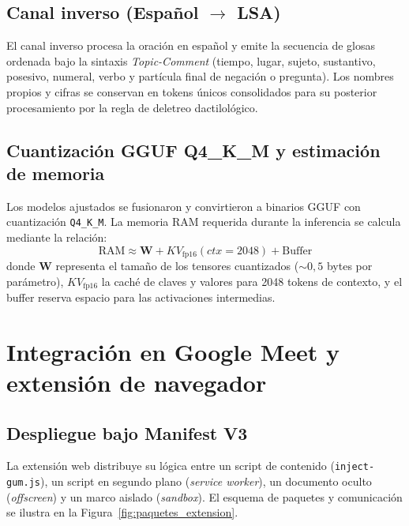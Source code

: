 \subsection{Canal inverso (Español $\rightarrow$ LSA)}
El canal inverso procesa la oración en español y emite la secuencia de glosas ordenada bajo la sintaxis \textit{Topic-Comment} (tiempo, lugar, sujeto, sustantivo, posesivo, numeral, verbo y partícula final de negación o pregunta). Los nombres propios y cifras se conservan en tokens únicos consolidados para su posterior procesamiento por la regla de deletreo dactilológico.

\subsection{Cuantización GGUF Q4\_K\_M y estimación de memoria}
Los modelos ajustados se fusionaron y convirtieron a binarios GGUF con cuantización \texttt{Q4\_K\_M}. La memoria RAM requerida durante la inferencia se calcula mediante la relación:
\begin{equation}
\text{RAM} \approx \mathbf{W} + KV_{\text{fp16}}(ctx=2048) + \text{Buffer}
\label{eq:ram_runtime}
\end{equation}
donde $\mathbf{W}$ representa el tamaño de los tensores cuantizados ($\sim 0{,}5$ bytes por parámetro), $KV_{\text{fp16}}$ la caché de claves y valores para 2048 tokens de contexto, y el buffer reserva espacio para las activaciones intermedias.

\section{Integración en Google Meet y extensión de navegador}

\subsection{Despliegue bajo Manifest V3}
La extensión web distribuye su lógica entre un script de contenido (\texttt{inject-gum.js}), un script en segundo plano (\textit{service worker}), un documento oculto (\textit{offscreen}) y un marco aislado (\textit{sandbox}). El esquema de paquetes y comunicación se ilustra en la Figura~\ref{fig:paquetes_extension}.

